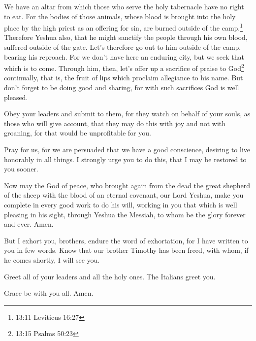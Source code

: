 \myverse{}We have an altar from which those who serve the holy tabernacle
have no right to eat.
\myverse{}For the bodies of those animals, whose blood is brought into the holy place
by the high priest as an offering for sin, are burned outside of the camp.\footnote{13:11 Leviticus 16:27}
\myverse{}Therefore Yeshua also, that he might sanctify the people through his own
blood, suffered outside of the gate.
\myverse{}Let’s therefore go out to him outside of the camp, bearing his reproach.
\myverse{}For we don’t have here an enduring city, but we seek that which is to come.
\myverse{}Through him, then, let’s offer up a sacrifice of praise to God\footnote{13:15 Psalms 50:23} continually, that is, the fruit of lips which
proclaim allegiance to his name.
\myverse{}But don’t forget to be doing good and sharing, for with such sacrifices God
is well pleased.

\myverse{}Obey your leaders and submit to them, for they watch on behalf
of your souls, as those who will give account, that they may do this with joy and not with groaning, for
that would be unprofitable for you.

\myverse{}Pray for us, for we are persuaded that we have a good conscience,
desiring to live honorably in all things. \myverse{}I strongly urge you to do this, that I may be restored to you sooner.

\myverse{}Now may the God of peace, who brought again from the dead the
great shepherd of the sheep with the blood of an eternal covenant, our Lord Yeshua,
\myverse{}make you complete in every good work to do his will, working in you that
which is well pleasing in his sight, through Yeshua the Messiah, to whom be the glory forever and ever.
Amen.

\myverse{}But I exhort you, brothers, endure the word of exhortation,
for I have written to you in few words.
\myverse{}Know that our brother Timothy has been freed, with whom, if he comes shortly,
I will see you.

\myverse{}Greet all of your leaders and all the holy ones. The Italians
greet you.

\myverse{}Grace be with you all. Amen.


